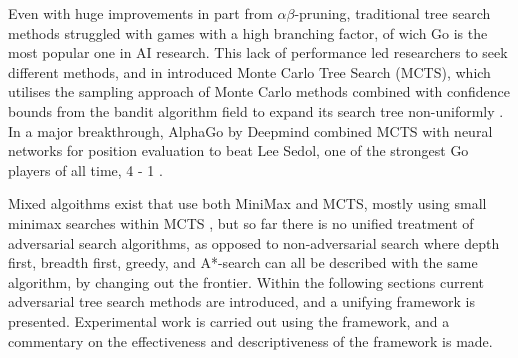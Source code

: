Even with huge improvements in part from $\alpha\beta$-pruning, traditional tree search methods struggled with games with a high branching factor, of wich Go is the most popular one in AI research. This lack of performance led researchers to seek different methods, and in \citeyear{Coulom2006} \citeauthor{Coulom2006} introduced Monte Carlo Tree Search (MCTS), which utilises the sampling approach of Monte Carlo methods combined with confidence bounds from the bandit algorithm field to expand its search tree non-uniformly \cite{Coulom2006}. In a major breakthrough, AlphaGo by Deepmind combined MCTS with neural networks for position evaluation to beat Lee Sedol, one of the strongest Go players of all time, 4 - 1 \cite{Silver2016}.

Mixed algoithms exist that use both MiniMax and MCTS, mostly using small minimax searches within MCTS \cite{Baier2014}, but so far there is no unified treatment of adversarial search algorithms, as opposed to non-adversarial search where depth first, breadth first, greedy, and A*-search can all be described with the same algorithm, by changing out the frontier. Within the following sections current adversarial tree search methods are introduced, and a unifying framework is presented. Experimental work is carried out using the framework, and a commentary on the effectiveness and descriptiveness of the framework is made.
